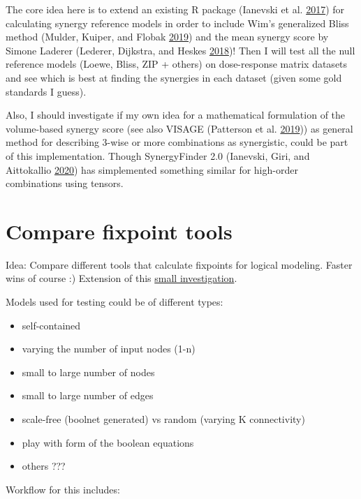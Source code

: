 \documentclass[
  12pt,
]{book}
\providecommand{\tightlist}{%
  \setlength{\itemsep}{0pt}\setlength{\parskip}{0pt}}
\begin{document}
The core idea here is to extend an existing R package (Ianevski et al. \protect\hyperlink{ref-Ianevski2017}{2017}) for calculating synergy reference models in order to include Wim's generalized Bliss method (Mulder, Kuiper, and Flobak \protect\hyperlink{ref-Mulder2019}{2019}) and the mean synergy score by Simone Laderer (Lederer, Dijkstra, and Heskes \protect\hyperlink{ref-Lederer2018}{2018})!
Then I will test all the null reference models (Loewe, Bliss, ZIP + others) on dose-response matrix datasets and see which is best at finding the synergies in each dataset (given some gold standards I guess).

Also, I should investigate if my own idea for a mathematical formulation of the volume-based synergy score (see also VISAGE (Patterson et al. \protect\hyperlink{ref-Patterson2019}{2019})) as general method for describing 3-wise or more combinations as synergistic, could be part of this implementation.
Though SynergyFinder 2.0 (Ianevski, Giri, and Aittokallio \protect\hyperlink{ref-Ianevski2020}{2020}) has simplemented something similar for high-order combinations using tensors.

\hypertarget{comp}{%
\section*{Compare fixpoint tools}\label{comp}}

Idea: Compare different tools that calculate fixpoints for logical modeling.
Faster wins of course :) Extension of this \protect\hyperlink{http:ux2fux2ftiny.ccux2fattr-tool-cmp}{small investigation}.

Models used for testing could be of different types:

\begin{itemize}
\tightlist
\item
  self-contained
\item
  varying the number of input nodes (1-n)
\item
  small to large number of nodes
\item
  small to large number of edges
\item
  scale-free (boolnet generated) vs random (varying K connectivity)
\item
  play with form of the boolean equations
\item
  others ???
\end{itemize}

Workflow for this includes:
\end{document}
